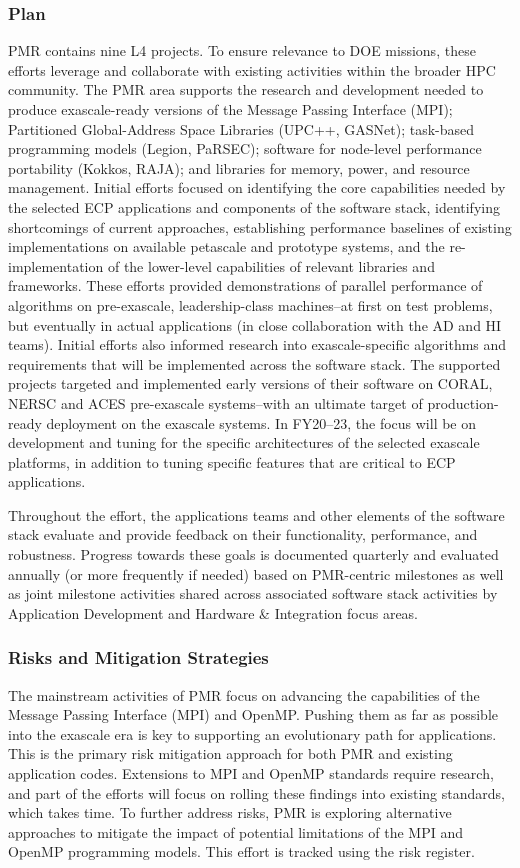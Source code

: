 \subsubsection{Plan}
PMR contains nine L4 projects. To ensure relevance to DOE missions, these efforts leverage and collaborate with existing activities within the broader HPC community. The PMR area supports the research and development needed to produce exascale-ready versions of the Message Passing Interface (MPI);  Partitioned Global-Address Space Libraries (UPC++, GASNet); task-based programming models (Legion, PaRSEC); software for node-level performance portability (Kokkos, RAJA); and libraries for memory, power, and resource management.
Initial efforts focused on identifying the core capabilities needed by the selected ECP applications and components of the software stack, identifying shortcomings of current approaches, establishing performance baselines of existing implementations on available petascale and prototype systems, and the re-implementation of the lower-level capabilities of relevant libraries and frameworks. These efforts provided demonstrations of parallel performance of algorithms on pre-exascale, leadership-class machines--at first on test problems, but eventually in actual applications (in close collaboration with the AD and HI teams). Initial efforts also informed research into exascale-specific algorithms and requirements that will be implemented across the software stack. The supported projects targeted and implemented early versions of their software on CORAL, NERSC and ACES pre-exascale systems--with an ultimate target of production-ready deployment on the exascale systems.
In FY20--23, the focus will be on development and tuning for the specific architectures of the selected exascale platforms, in addition to tuning specific features that are critical to ECP applications.

Throughout the effort, the applications teams and other elements of the software stack evaluate and provide feedback on their functionality, performance, and robustness. Progress towards these goals is documented quarterly and evaluated annually (or more frequently if needed) based on PMR-centric milestones as well as joint milestone activities shared across associated software stack activities by Application Development and Hardware \& Integration focus areas.


\subsubsection{Risks and Mitigation Strategies}
The mainstream activities of PMR focus on advancing the capabilities of the Message Passing Interface (MPI) and OpenMP. Pushing them as far as possible into the exascale era is key to supporting an evolutionary path for applications. This is the primary risk mitigation approach for both PMR and existing application codes. Extensions to MPI and OpenMP standards require research, and part of the efforts will focus on rolling these findings into existing standards, which takes time. To further address risks, PMR is exploring alternative approaches to mitigate the impact of potential limitations of the MPI and OpenMP programming models. This effort is tracked using the risk register.


